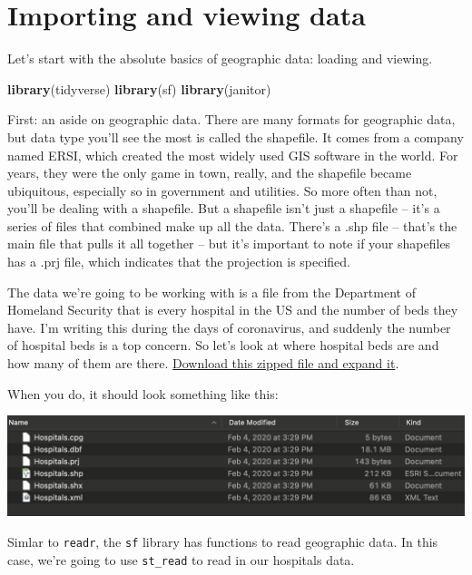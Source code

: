 \documentclass[]{book}
\newenvironment{Shaded}{\begin{snugshade}}{\end{snugshade}}
\newcommand{\KeywordTok}[1]{\textcolor[rgb]{0.13,0.29,0.53}{\textbf{#1}}}
\newcommand{\NormalTok}[1]{#1}
\begin{document}
\hypertarget{importing-and-viewing-data}{%
\section{Importing and viewing data}\label{importing-and-viewing-data}}

Let's start with the absolute basics of geographic data: loading and viewing.

\begin{Shaded}
\begin{Highlighting}[]
\KeywordTok{library}\NormalTok{(tidyverse)}
\KeywordTok{library}\NormalTok{(sf)}
\KeywordTok{library}\NormalTok{(janitor)}
\end{Highlighting}
\end{Shaded}

First: an aside on geographic data. There are many formats for geographic data, but data type you'll see the most is called the shapefile. It comes from a company named ERSI, which created the most widely used GIS software in the world. For years, they were the only game in town, really, and the shapefile became ubiquitous, especially so in government and utilities. So more often than not, you'll be dealing with a shapefile. But a shapefile isn't just a shapefile -- it's a series of files that combined make up all the data. There's a .shp file -- that's the main file that pulls it all together -- but it's important to note if your shapefiles has a .prj file, which indicates that the projection is specified.

The data we're going to be working with is a file from the Department of Homeland Security that is every hospital in the US and the number of beds they have. I'm writing this during the days of coronavirus, and suddenly the number of hospital beds is a top concern. So let's look at where hospital beds are and how many of them are there. \href{https://unl.box.com/s/o7seh9xqks7gknatihukbdyg6fgbihey}{Download this zipped file and expand it}.

When you do, it should look something like this:

\includegraphics[width=19.94in]{images/geolayers2}

Simlar to \texttt{readr}, the \texttt{sf} library has functions to read geographic data. In this case, we're going to use \texttt{st\_read} to read in our hospitals data.
\end{document}
